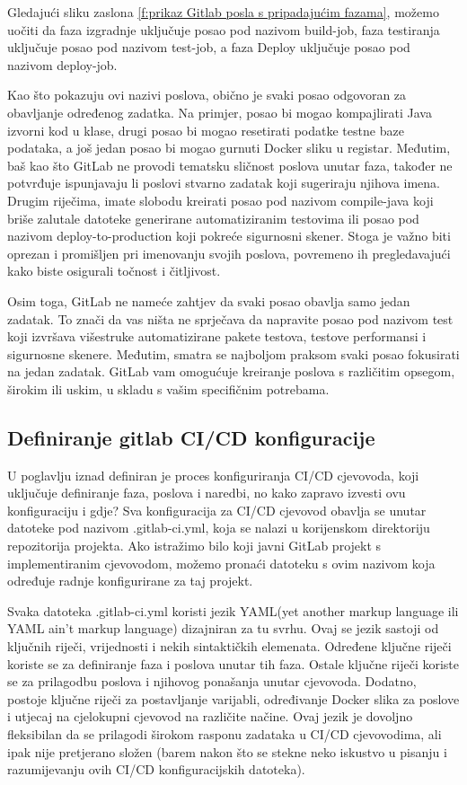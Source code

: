 \documentclass[a4paper,12pt,oneside]{article}
\begin{document}
Gledajući sliku zaslona \ref{f:prikaz Gitlab posla s pripadajućim fazama}, možemo uočiti da faza izgradnje uključuje posao pod nazivom build-job, faza testiranja uključuje posao pod nazivom test-job, a faza Deploy uključuje posao pod nazivom deploy-job.

Kao što pokazuju ovi nazivi poslova, obično je svaki posao odgovoran za obavljanje određenog zadatka. Na primjer, posao bi mogao kompajlirati Java izvorni kod u klase, drugi posao bi mogao resetirati podatke testne baze podataka, a još jedan posao bi mogao gurnuti Docker sliku u registar. Međutim, baš kao što GitLab ne provodi tematsku sličnost poslova unutar faza, također ne potvrđuje ispunjavaju li poslovi stvarno zadatak koji sugeriraju njihova imena. Drugim riječima, imate slobodu kreirati posao pod nazivom compile-java koji briše zalutale datoteke generirane automatiziranim testovima ili posao pod nazivom deploy-to-production koji pokreće sigurnosni skener. Stoga je važno biti oprezan i promišljen pri imenovanju svojih poslova, povremeno ih pregledavajući kako biste osigurali točnost i čitljivost.

Osim toga, GitLab ne nameće zahtjev da svaki posao obavlja samo jedan zadatak. To znači da vas ništa ne sprječava da napravite posao pod nazivom test koji izvršava višestruke automatizirane pakete testova, testove performansi i sigurnosne skenere. Međutim, smatra se najboljom praksom svaki posao fokusirati na jedan zadatak. GitLab vam omogućuje kreiranje poslova s različitim opsegom, širokim ili uskim, u skladu s vašim specifičnim potrebama.


\subsection{Definiranje gitlab CI/CD konfiguracije}

U poglavlju iznad definiran je proces konfiguriranja CI/CD cjevovoda, koji uključuje definiranje faza, poslova i naredbi, no kako zapravo izvesti ovu konfiguraciju i gdje? Sva konfiguracija za CI/CD cjevovod obavlja se unutar datoteke pod nazivom .gitlab-ci.yml, koja se nalazi u korijenskom direktoriju repozitorija projekta. Ako istražimo bilo koji javni GitLab projekt s implementiranim cjevovodom, možemo pronaći datoteku s ovim nazivom koja određuje radnje konfigurirane za taj projekt.

Svaka datoteka .gitlab-ci.yml koristi jezik YAML(yet another markup language ili YAML ain't markup language) dizajniran za tu svrhu. Ovaj se jezik sastoji od ključnih riječi, vrijednosti i nekih sintaktičkih elemenata. Određene ključne riječi koriste se za definiranje faza i poslova unutar tih faza. Ostale ključne riječi koriste se za prilagodbu poslova i njihovog ponašanja unutar cjevovoda. Dodatno, postoje ključne riječi za postavljanje varijabli, određivanje Docker slika za poslove i utjecaj na cjelokupni cjevovod na različite načine. Ovaj jezik je dovoljno fleksibilan da se prilagodi širokom rasponu zadataka u CI/CD cjevovodima, ali ipak nije pretjerano složen (barem nakon što se stekne neko iskustvo u pisanju i razumijevanju ovih CI/CD konfiguracijskih datoteka).
\end{document}
